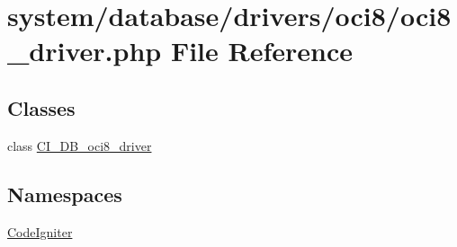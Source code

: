 \hypertarget{oci8__driver_8php}{}\section{system/database/drivers/oci8/oci8\+\_\+driver.php File Reference}
\label{oci8__driver_8php}
\subsection*{Classes}
\begin{DoxyCompactItemize}
\item 
class \mbox{\hyperlink{class_c_i___d_b__oci8__driver}{C\+I\+\_\+\+D\+B\+\_\+oci8\+\_\+driver}}
\end{DoxyCompactItemize}
\subsection*{Namespaces}
\begin{DoxyCompactItemize}
\item 
 \mbox{\hyperlink{namespace_code_igniter}{Code\+Igniter}}
\end{DoxyCompactItemize}
